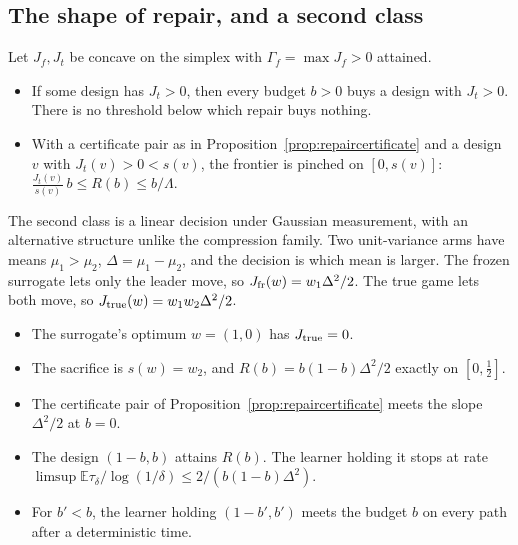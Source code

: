 \subsection{The shape of repair, and a second class}
\begin{proposition}
\label{prop:shape}
Let $J_f,J_t$ be concave on the simplex with $\Gamma_f=\max J_f>0$ attained.
\begin{itemize}
\item If some design has $J_t>0$, then every budget $b>0$ buys a design with $J_t>0$. There is
no threshold below which repair buys nothing.
\item With a certificate pair as in Proposition~\ref{prop:repaircertificate} and a design $v$
with $J_t(v)>0<s(v)$, the frontier is pinched on $[0,s(v)]$:
$\frac{J_t(v)}{s(v)}\,b\le R(b)\le b/\Lambda$.
\end{itemize}
\end{proposition}

The second class is a linear decision under Gaussian measurement, with an alternative
structure unlike the compression family. Two unit-variance arms have means $\mu_1>\mu_2$,
$\Delta=\mu_1-\mu_2$, and the decision is which mean is larger. The frozen surrogate lets only
the leader move, so $J_{\rm fr}(w)=w_1\Delta^2/2$. The true game lets both move, so
$J_{\rm true}(w)=w_1w_2\Delta^2/2$.

\begin{proposition}
\label{prop:twoarm}
\begin{itemize}
\item The surrogate's optimum $w=(1,0)$ has $J_{\rm true}=0$.
\item The sacrifice is $s(w)=w_2$, and $R(b)=b(1-b)\Delta^2/2$ exactly on $[0,\frac12]$.
\item The certificate pair of Proposition~\ref{prop:repaircertificate} meets the slope
$\Delta^2/2$ at $b=0$.
\item The design $(1-b,b)$ attains $R(b)$. The learner holding it stops at rate
$\limsup\mathbb E\tau_\delta/\log(1/\delta)\le2/(b(1-b)\Delta^2)$.
\item For $b'<b$, the learner holding $(1-b',b')$ meets the budget $b$ on every path after a
deterministic time.
\end{itemize}
\end{proposition}

